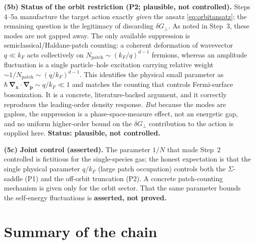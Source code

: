 \documentclass[11pt]{article}
\theoremstyle{remark}
\begin{document}
\medskip
\noindent\textbf{(5b) Status of the orbit restriction (P2; plausible, not controlled).}
Steps 4--5a manufacture the target action exactly \emph{given} the ansatz
\eqref{eq:orbitansatz}; the remaining question is the legitimacy of discarding
$\delta G_\perp$. As noted in Step~3, these modes are not gapped away. The only available
suppression is semiclassical/Haldane-patch counting: a coherent deformation of wavevector
$q\ll k_F$ acts collectively on $N_{\mathrm{patch}}\sim(k_F/q)^{d-1}$ fermions, whereas an
amplitude fluctuation is a single particle--hole excitation carrying relative weight
$\sim 1/N_{\mathrm{patch}}\sim(q/k_F)^{d-1}$. This identifies the physical small parameter
as $\hbar\,\boldsymbol{\nabla}_{\boldsymbol{x}}\!\cdot\!\boldsymbol{\nabla}_{\boldsymbol{p}}
\sim q/k_F\ll1$ and matches the counting that controls Fermi-surface bosonization. It is a
concrete, literature-backed argument, and it correctly reproduces the leading-order
density response. \emph{But} because the modes are gapless, the suppression is a
phase-space-measure effect, not an energetic gap, and no uniform higher-order bound on the
$\delta G_\perp$ contribution to the action is supplied here. \textbf{Status: plausible,
not controlled.}

\medskip
\noindent\textbf{(5c) Joint control (asserted).} The parameter $1/N$ that made Step~2
controlled is fictitious for the single-species gas; the honest expectation is that the
single physical parameter $q/k_F$ (large patch occupation) controls both the
$\Sigma$-saddle (P1) and the off-orbit truncation (P2). A concrete patch-counting
mechanism is given only for the orbit sector. That the same parameter bounds the
self-energy fluctuations is \textbf{asserted, not proved.}

\section{Summary of the chain}
\end{document}
